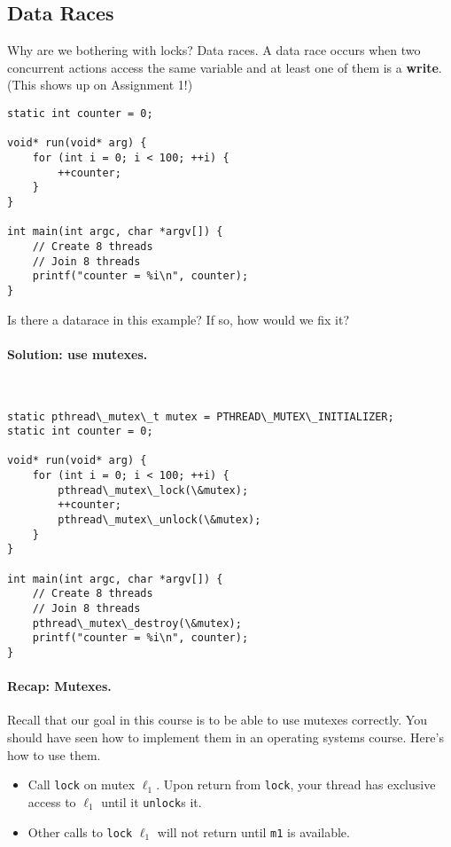   \subsection*{Data Races}
  \vspace*{-1em}
Why are we bothering with locks? Data races. A data race occurs when
two concurrent actions access the same variable and at least one of
them is a {\bf write}. (This shows up on Assignment 1!)

  \begin{verbatim}
static int counter = 0;

void* run(void* arg) {
    for (int i = 0; i < 100; ++i) {
        ++counter;
    }
}

int main(int argc, char *argv[]) {
    // Create 8 threads
    // Join 8 threads
    printf("counter = %i\n", counter);
}
  \end{verbatim}

Is there a datarace in this example? If so, how would we fix it?

\paragraph{Solution: use mutexes.}~

  \begin{verbatim}
static pthread\_mutex\_t mutex = PTHREAD\_MUTEX\_INITIALIZER;
static int counter = 0;

void* run(void* arg) {
    for (int i = 0; i < 100; ++i) {
        pthread\_mutex\_lock(\&mutex);
        ++counter;
        pthread\_mutex\_unlock(\&mutex);
    }
}

int main(int argc, char *argv[]) {
    // Create 8 threads
    // Join 8 threads
    pthread\_mutex\_destroy(\&mutex);
    printf("counter = %i\n", counter);
}
  \end{verbatim}
  
  
\paragraph{Recap: Mutexes.} Recall that our goal in this course is
to be able to use mutexes correctly. 
You should have seen how to 
implement them in an operating systems course. Here's how to use them.

\begin{itemize}
\item Call {\tt lock} on mutex $\ell_1$. Upon return from
      {\tt lock}, your thread has exclusive access to $\ell_1$ until it
      {\tt unlock}s it.
\item Other calls to {\tt lock} $\ell_1$ will not return
      until {\tt m1} is available.
\end{itemize}

